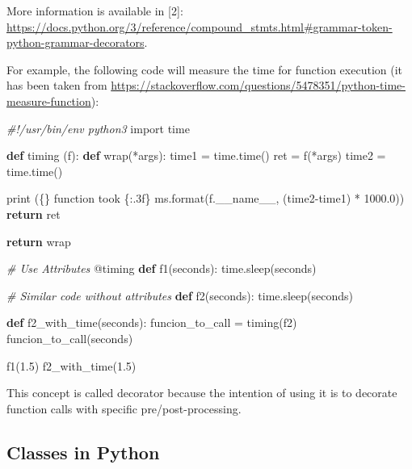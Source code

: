\documentclass[
]{article}
\newenvironment{Shaded}{}{}
\newcommand{\AttributeTok}[1]{\textcolor[rgb]{0.49,0.56,0.16}{#1}}
\newcommand{\BuiltInTok}[1]{#1}
\newcommand{\CommentTok}[1]{\textcolor[rgb]{0.38,0.63,0.69}{\textit{#1}}}
\newcommand{\ControlFlowTok}[1]{\textcolor[rgb]{0.00,0.44,0.13}{\textbf{#1}}}
\newcommand{\FloatTok}[1]{\textcolor[rgb]{0.25,0.63,0.44}{#1}}
\newcommand{\ImportTok}[1]{#1}
\newcommand{\KeywordTok}[1]{\textcolor[rgb]{0.00,0.44,0.13}{\textbf{#1}}}
\newcommand{\NormalTok}[1]{#1}
\newcommand{\OperatorTok}[1]{\textcolor[rgb]{0.40,0.40,0.40}{#1}}
\newcommand{\SpecialCharTok}[1]{\textcolor[rgb]{0.25,0.44,0.63}{#1}}
\newcommand{\StringTok}[1]{\textcolor[rgb]{0.25,0.44,0.63}{#1}}
\newcommand{\VariableTok}[1]{\textcolor[rgb]{0.10,0.09,0.49}{#1}}
\begin{document}
More information is available in {[}2{]}:\\
\url{https://docs.python.org/3/reference/compound_stmts.html\#grammar-token-python-grammar-decorators}.

For example, the following code will measure the time for function
execution (it has been taken from
\url{https://stackoverflow.com/questions/5478351/python-time-measure-function}):

\begin{Shaded}
\begin{Highlighting}[]
\CommentTok{\#!/usr/bin/env python3}
\ImportTok{import}\NormalTok{ time   }

\KeywordTok{def}\NormalTok{ timing (f):}
  \KeywordTok{def}\NormalTok{ wrap(}\OperatorTok{*}\NormalTok{args):}
\NormalTok{      time1 }\OperatorTok{=}\NormalTok{ time.time()}
\NormalTok{      ret }\OperatorTok{=}\NormalTok{ f(}\OperatorTok{*}\NormalTok{args) }
\NormalTok{      time2 }\OperatorTok{=}\NormalTok{ time.time()}
      
      \BuiltInTok{print}\NormalTok{ (}\StringTok{\textquotesingle{}}\SpecialCharTok{\{\}}\StringTok{ function took }\SpecialCharTok{\{:.3f\}}\StringTok{ ms\textquotesingle{}}\NormalTok{.}\BuiltInTok{format}\NormalTok{(f.}\VariableTok{\_\_name\_\_}\NormalTok{, (time2}\OperatorTok{{-}}\NormalTok{time1) }\OperatorTok{*} \FloatTok{1000.0}\NormalTok{))           }
      \ControlFlowTok{return}\NormalTok{ ret     }

  \ControlFlowTok{return}\NormalTok{ wrap   }

\CommentTok{\# Use Attributes}
\AttributeTok{@timing} 
\KeywordTok{def}\NormalTok{ f1(seconds): }
\NormalTok{  time.sleep(seconds)   }

\CommentTok{\# Similar code without attributes}
\KeywordTok{def}\NormalTok{ f2(seconds):}
\NormalTok{  time.sleep(seconds)   }

\KeywordTok{def}\NormalTok{ f2\_with\_time(seconds):}
\NormalTok{  funcion\_to\_call }\OperatorTok{=}\NormalTok{ timing(f2)}
\NormalTok{  funcion\_to\_call(seconds)}

\NormalTok{f1(}\FloatTok{1.5}\NormalTok{)}
\NormalTok{f2\_with\_time(}\FloatTok{1.5}\NormalTok{)}
\end{Highlighting}
\end{Shaded}

This concept is called decorator because the intention of using it is to
decorate function calls with specific pre/post-processing.

\hypertarget{classes-in-python}{%
\subsection{Classes in Python}\label{classes-in-python}}
\end{document}
